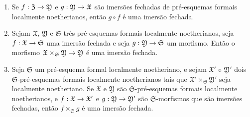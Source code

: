 \documentclass[oneside]{amsart}
\makeatletter
\newcommand{\ega@arrow}[2]{\mathchoice{#1}{#2}{#2}{#2}}
\renewcommand{\to}{\ega@arrow{\longrightarrow}{\rightarrow}}
\newcommand{\oldpage}[2][]{{\marginnote{\normalfont\textbf{#1}~|~#2}}\ignorespaces}
\let\EGAOriginalLabel\label
\renewcommand{\label}[1]{\phantomsection\EGAOriginalLabel{#1}}
\makeatother
\begin{document}
\begin{proposition}[10.14.5]
\label{I.10.14.5}
\medskip\noindent
\begin{enumerate}
  \item[\rm{(i)}] Se $f:\mathfrak{Z}\to\mathfrak{Y}$ e $g:\mathfrak{Y}\to\mathfrak{X}$ são imersões fechadas de pré-esquemas formais localmente noetherianos, então $g\circ f$ é uma imersão fechada.
\oldpage[I]{211}
  \item[\rm{(ii)}] Sejam $\mathfrak{X}$, $\mathfrak{Y}$ e $\mathfrak{S}$ três pré-esquemas formais localmente noetherianos, seja $f:\mathfrak{X}\to\mathfrak{S}$ uma imersão fechada e seja $g:\mathfrak{Y}\to\mathfrak{S}$ um morfismo.
    Então o morfismo $\mathfrak{X}\times_\mathfrak{S}\mathfrak{Y}\to\mathfrak{Y}$ é uma imersão fechada.
  \item[\rm{(iii)}] Seja $\mathfrak{S}$ um pré-esquema formal localmente noetheriano, e sejam $\mathfrak{X}'$ e $\mathfrak{Y}'$ dois $\mathfrak{S}$-pré-esquemas formais localmente noetherianos tais que $\mathfrak{X}'\times_\mathfrak{S}\mathfrak{Y}'$ seja localmente noetheriano.
    Se $\mathfrak{X}$ e $\mathfrak{Y}$ são $\mathfrak{S}$-pré-esquemas formais localmente noetherianos, e $f:\mathfrak{X}\to\mathfrak{X}'$ e $g:\mathfrak{Y}\to\mathfrak{Y}'$ são $\mathfrak{S}$-morfismos que são imersões fechadas, então $f\times_\mathfrak{S}g$ é uma imersão fechada.
\end{enumerate}
\end{proposition}
\end{document}
